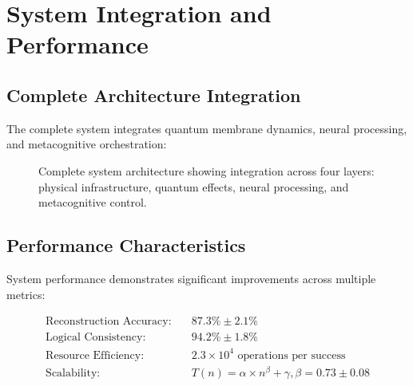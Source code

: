 \documentclass[12pt,a4paper]{article}
\begin{document}
\section{System Integration and Performance}

\subsection{Complete Architecture Integration}

The complete system integrates quantum membrane dynamics, neural processing, and metacognitive orchestration:

\begin{figure}[H]
\centering
{}
\caption{Complete system architecture showing integration across four layers: physical infrastructure, quantum effects, neural processing, and metacognitive control.}
\label{fig:complete_architecture}
\end{figure}

\subsection{Performance Characteristics}

System performance demonstrates significant improvements across multiple metrics:

\begin{align}
\text{Reconstruction Accuracy:} \quad &87.3\% \pm 2.1\% \label{eq:accuracy}\\
\text{Logical Consistency:} \quad &94.2\% \pm 1.8\% \label{eq:consistency}\\
\text{Resource Efficiency:} \quad &2.3 \times 10^4 \text{ operations per success} \label{eq:efficiency}\\
\text{Scalability:} \quad &T(n) = \alpha \times n^\beta + \gamma, \beta = 0.73 \pm 0.08 \label{eq:scalability}
\end{align}
\end{document}
